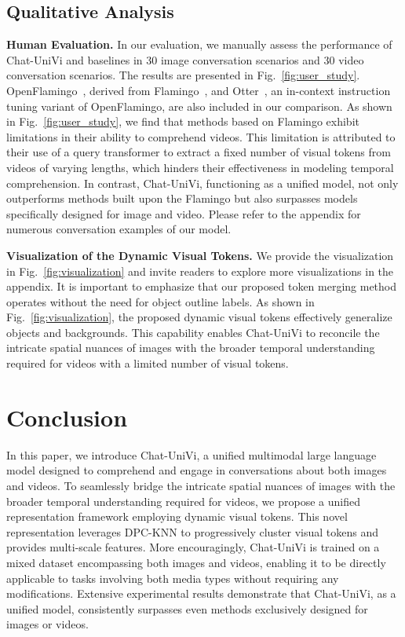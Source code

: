 \documentclass[10pt,twocolumn,letterpaper]{article}
\newcommand{\myparagraph}[1]{\textbf{#1}\hspace{1.8ex}}
\begin{document}
\subsection{Qualitative Analysis}
\noindent \myparagraph{Human Evaluation.} In our evaluation, we manually assess the performance of Chat-UniVi and baselines in 30 image conversation scenarios and 30 video conversation scenarios. The results are presented in Fig.~\ref{fig:user_study}. OpenFlamingo~\cite{awadalla2023openflamingo}, derived from Flamingo~\cite{alayrac2022flamingo}, and Otter~\cite{li2023otter}, an in-context instruction tuning variant of OpenFlamingo, are also included in our comparison. As shown in Fig.~\ref{fig:user_study}, we find that methods based on Flamingo exhibit limitations in their ability to comprehend videos. This limitation is attributed to their use of a query transformer to extract a fixed number of visual tokens from videos of varying lengths, which hinders their effectiveness in modeling temporal comprehension. In contrast, Chat-UniVi, functioning as a unified model, not only outperforms methods built upon the Flamingo but also surpasses models specifically designed for image and video. Please refer to the appendix for numerous conversation examples of our model.

\noindent \myparagraph{Visualization of the Dynamic Visual Tokens.} We provide the visualization in Fig.~\ref{fig:visualization} and invite readers to explore more visualizations in the appendix. It is important to emphasize that our proposed token merging method operates without the need for object outline labels. As shown in Fig.~\ref{fig:visualization}, the proposed dynamic visual tokens effectively generalize objects and backgrounds. This capability enables Chat-UniVi to reconcile the intricate spatial nuances of images with the broader temporal understanding required for videos with a limited number of visual tokens.

\section{Conclusion}
In this paper, we introduce Chat-UniVi, a unified multimodal large language model designed to comprehend and engage in conversations about both images and videos. To seamlessly bridge the intricate spatial nuances of images with the broader temporal understanding required for videos, we propose a unified representation framework employing dynamic visual tokens. This novel representation leverages DPC-KNN to progressively cluster visual tokens and provides multi-scale features. More encouragingly, Chat-UniVi is trained on a mixed dataset encompassing both images and videos, enabling it to be directly applicable to tasks involving both media types without requiring any modifications. Extensive experimental results demonstrate that Chat-UniVi, as a unified model, consistently surpasses even methods exclusively designed for images or videos.
\end{document}
